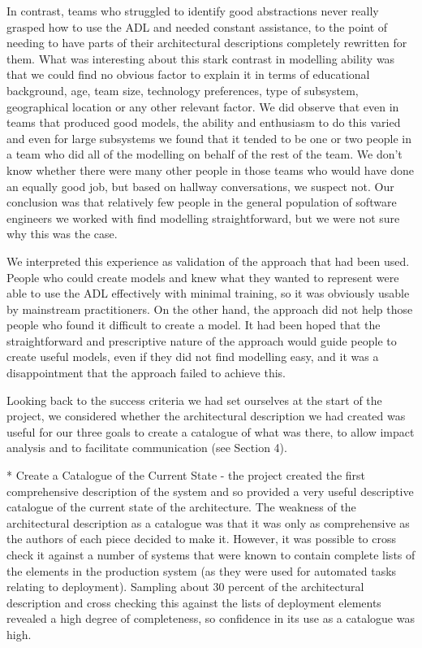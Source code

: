 \begin{itemise}
  In contrast, teams who struggled to identify good abstractions never really grasped how to use the ADL and needed constant assistance, to the point of needing to have parts of their architectural descriptions completely rewritten for them.   What was interesting about this stark contrast in modelling ability was that we could find no obvious factor to explain it in terms of educational background, age, team size, technology preferences, type of subsystem, geographical location or any other relevant factor.  We did observe that even in teams that produced good models, the ability and enthusiasm to do this varied and even for large subsystems we found that it tended to be one or two people in a team who did all of the modelling on behalf of the rest of the team.  We don't know whether there were many other people in those teams who would have done an equally good job, but based on hallway conversations, we suspect not.  Our conclusion was that relatively few people in the general population of software engineers we worked with find modelling straightforward, but we were not sure why this was the case.

  We interpreted this experience as validation of the approach that had been used.  People who could create models and knew what they wanted to represent were able to use the ADL effectively with minimal training, so it was obviously usable by mainstream practitioners.  On the other hand, the approach did not help those people who found it difficult to create a model.  It had been hoped that the straightforward and prescriptive nature of the approach would guide people to create useful models, even if they did not find modelling easy, and it was a disappointment that the approach failed to achieve this.

  Looking back to the success criteria we had set ourselves at the start of the project, we considered whether the architectural description we had created was useful for our three goals to create a catalogue of what was there, to allow impact analysis and to facilitate communication (see Section 4).

* Create a Catalogue of the Current State - the project created the first comprehensive description of the system and so provided a very useful descriptive catalogue of the current state of the architecture.  The weakness of the architectural description as a catalogue was that it was only as comprehensive as the authors of each piece decided to make it.  However, it was possible to cross check it against a number of systems that were known to contain complete lists of the elements in the production system (as they were used for automated tasks relating to deployment).  Sampling about 30 percent of the architectural description and cross checking this against the lists of deployment elements revealed a high degree of completeness, so confidence in its use as a catalogue was high.


\end{itemise}
